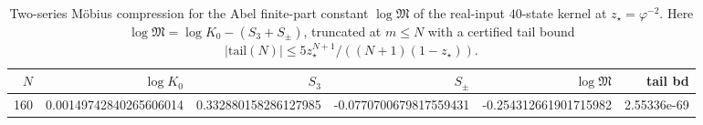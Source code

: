 \begin{table}[H]
\centering
\scriptsize
\setlength{\tabcolsep}{6pt}
\caption{Two-series Möbius compression for the Abel finite-part constant $\log\mathfrak{M}$ of the real-input $40$-state kernel at $z_\star=\varphi^{-2}$. Here $\log\mathfrak{M}=\log K_0-(S_3+S_{\pm})$, truncated at $m\le N$ with a certified tail bound $|\mathrm{tail}(N)|\le 5z_\star^{N+1}/((N+1)(1-z_\star))$.}
\label{tab:real_input_40_abel_mertens_two_series_split}
\begin{tabular}{r r r r r r}
\toprule
$N$ & $\log K_0$ & $S_3$ & $S_{\pm}$ & $\log\mathfrak{M}$ & tail bd\\
\midrule
160 & 0.00149742840265606014 & 0.332880158286127985 & -0.0770700679817559431 & -0.254312661901715982 & 2.55336e-69\\
\bottomrule
\end{tabular}
\end{table}
